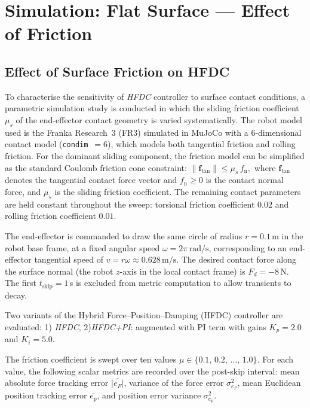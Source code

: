 \documentclass[
	german,%
	accentcolor=9c,%
	ruledheaders=section,%
	class=report,%
	thesis={type=bachelor},%
	fontsize=11pt,%
	parskip=half-,%
	custommargins=true,%
	marginpar=false,%
]{tudapub}
\begin{document}
\section{Simulation: Flat Surface — Effect of Friction}

\subsection{Effect of Surface Friction on HFDC}
\label{sec:friction_sweep}

To characterise the sensitivity of \emph{HFDC} controller to
surface contact conditions, a parametric simulation study is conducted in
which the sliding friction coefficient $\mu_s$ of the end-effector contact
geometry is varied systematically.
The robot model used is the Franka Research~3 (FR3) simulated in
MuJoCo with a 6-dimensional contact model
(\texttt{condim}~$= 6$), which models both tangential friction and rolling friction. For the dominant sliding component, the friction model can be simplified as the standard Coulomb friction cone constraint:
$
    \|\mathbf{f}_{\mathrm{tan}}\| \leq \mu_s \, f_{\mathrm{n}},
    \label{eq:friction_cone}
$
where $\mathbf{f}_{\mathrm{tan}}$ denotes the tangential
contact force vector and $f_{\mathrm{n}} \geq 0$ is the contact normal
force, and $\mu_s$ is the sliding friction coefficient.
The remaining contact parameters are held constant throughout the sweep:
torsional friction coefficient $0.02$ and rolling friction coefficient
$0.01$.

The end-effector is commanded to draw the same circle of radius $r = 0.1\,\mathrm{m}$ in the robot base frame, at a fixed
angular speed $\omega = 2\pi\,\mathrm{rad/s}$, corresponding to an end-effector
tangential speed of $v = r\omega \approx 0.628\,\mathrm{m/s}$.
The desired contact force along the surface normal (the robot $z$-axis
in the local contact frame) is $F_d = -8\,\mathrm{N}$. The first $t_{\mathrm{skip}} = 1$\,s
is excluded from metric computation to allow transients to decay.

Two variants of the Hybrid Force–Position–Damping (HFDC) controller are 
evaluated: 1) \emph{HFDC}, 2)\emph{HFDC+PI}: augmented with PI term with gains $K_p = 2.0$ and $K_i = 5.0$.

The friction coefficient is swept over ten values
$\mu \in \{0.1,\,0.2,\,\ldots,\,1.0\}$.
For each value, the following scalar metrics are recorded over the
post-skip interval:
mean absolute force tracking error $\overline{|e_F|}$,
variance of the force error $\sigma^2_{e_F}$,
mean Euclidean position tracking error $\overline{e_p}$,
and position error variance $\sigma^2_{e_p}$. 
\end{document}

